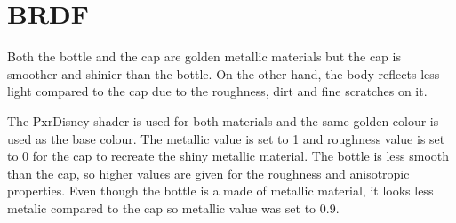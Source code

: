 \section{BRDF}
Both the bottle and the cap are golden metallic materials but the cap is smoother and shinier than the bottle. On the other hand, the body reflects less light compared to the cap due to the roughness, dirt and fine scratches on it.


The PxrDisney shader is used for both materials and the same golden colour is used as the base colour. The metallic value is set to 1 and roughness value is set to 0 for the cap to recreate the shiny metallic material. The bottle is less smooth than the cap, so higher values are given for the roughness and anisotropic properties. Even though the bottle is a made of metallic material, it looks less metalic compared to the cap so metallic value was set to 0.9.